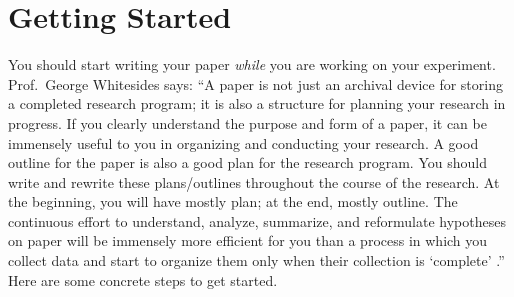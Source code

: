 \maketitle
\section{\label{sec:Start}Getting Started}

 You should start writing your paper \textit{while} you are working on your experiment. Prof.\ George Whitesides says: ``A paper is not just an archival device for storing a completed research program; it is also a structure for planning your research in progress. If you clearly understand the purpose and form of a paper, it can be immensely useful to you in organizing and conducting your research. A good outline for the paper is also a good plan for the research program. You should write and rewrite these plans/outlines throughout the course of the research. At the beginning, you will have mostly plan; at the end, mostly outline. The continuous effort to understand, analyze, summarize, and reformulate hypotheses on paper will be immensely more efficient for you than a process in which you collect data and start to organize them only when their collection is `complete' .'' Here are some concrete steps to get started.


